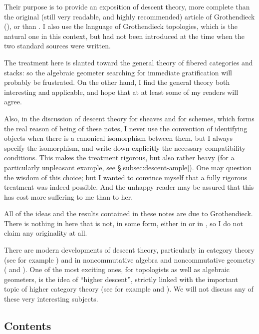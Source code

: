 \begin{0   INTRODUCTION}
Their purpose is to provide an exposition of descent theory, more complete than the original (still very readable, and highly recommended) article of Grothendieck (\cite{grothendieck-descent}), or than \cite{sga1}. I also use the language of Grothendieck topologies, which is the natural one in this context, but had not been introduced at the time when the two standard sources were written. 

The treatment here is slanted toward the general theory of fibered categories and stacks: so the algebraic geometer searching for immediate gratification will probably be frustrated. On the other hand, I find the general theory both interesting and applicable, and hope that at at least some of my readers will agree.

Also, in the discussion of descent theory for \qc sheaves and for schemes, which forms the real reason of being of these notes, I never use the convention of identifying objects when there is a canonical isomorphism between them, but  I always specify the isomorphism, and write down explicitly the necessary compatibility conditions. This makes the treatment rigorous, but also rather heavy (for a particularly unpleasant example, see \S\ref{subsec:descent-ample}). One may question the wisdom of this choice; but I wanted to convince myself that a fully rigorous treatment was indeed possible. And the unhappy reader may be assured that this has cost more suffering to me than to her.

All of the ideas and the results contained in these notes are due to Grothendieck. There is nothing in here that is not, in some form, either in \cite{sga1} or in \cite{sga4}, so I do not claim any originality at all.

There are modern developments of descent theory, particularly in category theory (see for example \cite{joyal-tierney}) and in non\dash commutative algebra and non\dash commutative geometry (\cite{kontsevich-rosenberg-descent} and \cite{kontsevich-rosenberg-stacks}). One of the most exciting ones, for topologists as well as algebraic geometers, is the idea of ``higher descent'', strictly linked with the important topic of higher category theory (see for example \cite{hirschowitz-simpson} and \cite{street-descent}). We will not discuss any of these very interesting subjects.


\subsection*{Contents}


\end{0   INTRODUCTION}
